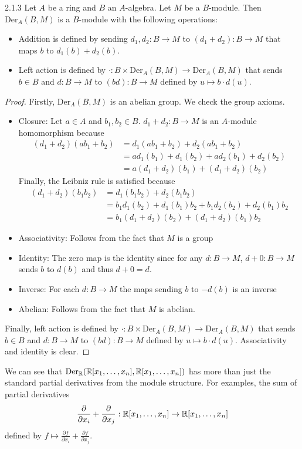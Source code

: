 \documentclass[a4paper]{article}
\begin{document}
\begin{lmm}{}{2.1.3} Let $A$ be a ring and $B$ an $A$-algebra. Let $M$ be a $B$-module. Then $\text{Der}_A(B,M)$ is a $B$-module with the following operations: 
\begin{itemize}
\item Addition is defined by sending $d_1,d_2:B\to M$ to $(d_1+d_2):B\to M$ that maps $b$ to $d_1(b)+d_2(b)$. 
\item Left action is defined by $\cdot:B\times\text{Der}_A(B,M)\to\text{Der}_A(B,M)$ that sends $b\in B$ and $d:B\to M$ to $(bd):B\to M$ defined by $u\mapsto b\cdot d(u)$.
\end{itemize} \tcbline
\begin{proof}
Firstly, $\text{Der}_A(B,M)$ is an abelian group. We check the group axioms. 
\begin{itemize}
\item Closure: Let $a\in A$ and $b_1,b_2\in B$. $d_1+d_2:B\to M$ is an $A$-module homomorphism because 
\begin{align*}
(d_1+d_2)(ab_1+b_2)&=d_1(ab_1+b_2)+d_2(ab_1+b_2)\\
&=ad_1(b_1)+d_1(b_2)+ad_2(b_1)+d_2(b_2)\\
&=a(d_1+d_2)(b_1)+(d_1+d_2)(b_2)
\end{align*}
Finally, the Leibniz rule is satisfied because 
\begin{align*}
(d_1+d_2)(b_1b_2)&=d_1(b_1b_2)+d_2(b_1b_2)\\
&=b_1d_1(b_2)+d_1(b_1)b_2+b_1d_2(b_2)+d_2(b_1)b_2\\
&=b_1(d_1+d_2)(b_2)+(d_1+d_2)(b_1)b_2
\end{align*}
\item Associativity: Follows from the fact that $M$ is a group
\item Identity: The zero map is the identity since for any $d:B\to M$, $d+0:B\to M$ sends $b$ to $d(b)$ and thus $d+0=d$. 
\item Inverse: For each $d:B\to M$ the maps sending $b$ to $-d(b)$ is an inverse
\item Abelian: Follows from the fact that $M$ is abelian. 
\end{itemize}
Finally, left action is defined by $\cdot:B\times\text{Der}_A(B,M)\to\text{Der}_A(B,M)$ that sends $b\in B$ and $d:B\to M$ to $(bd):B\to M$ defined by $u\mapsto b\cdot d(u)$. Associativity and identity is clear. 
\end{proof}
\end{lmm}

We can see that $\text{Der}_{\mathbb{R}}(\mathbb{R}[x_1,\dots,x_n],\mathbb{R}[x_1,\dots,x_n])$ has more than just the standard partial derivatives from the module structure. For examples, the sum of partial derivatives $$\frac{\partial}{\partial x_i}+\frac{\partial}{\partial x_j}:\mathbb{R}[x_1,\dots,x_n]\to\mathbb{R}[x_1,\dots,x_n]$$ defined by $f\mapsto\frac{\partial f}{\partial x_i}+\frac{\partial f}{\partial x_j}$. \\~\\
\end{document}

